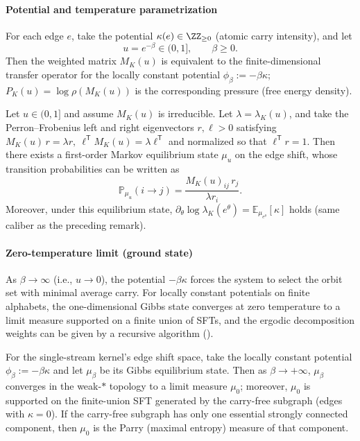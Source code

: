 \paragraph{Potential and temperature parametrization}
For each edge $e$, take the potential $\kappa(e)\in\ZZ_{\ge 0}$ (atomic carry intensity), and let
\[
u=e^{-\beta}\in(0,1],\qquad \beta\ge 0.
\]
Then the weighted matrix $M_K(u)$ is equivalent to the finite-dimensional transfer operator for the locally constant potential $\phi_\beta:=-\beta\kappa$; $P_K(u)=\log\rho(M_K(u))$ is the corresponding pressure (free energy density).

\begin{proposition}\label{prop:kernel-equilibrium-pf}
Let $u\in(0,1]$ and assume $M_K(u)$ is irreducible. Let $\lambda=\lambda_K(u)$, and take the Perron--Frobenius left and right eigenvectors $r,\ell>0$ satisfying
\(
M_K(u)\,r=\lambda r,\ \ell^{\mathsf T}M_K(u)=\lambda \ell^{\mathsf T}
\)
and normalized so that $\ell^{\mathsf T}r=1$. Then there exists a first-order Markov equilibrium state $\mu_u$ on the edge shift, whose transition probabilities can be written as
\[
\mathbb{P}_{\mu_u}(i\to j)=\frac{M_K(u)_{ij}\,r_j}{\lambda r_i}.
\]
Moreover, under this equilibrium state,
\(
\partial_\theta \log\lambda_K(e^\theta)=\mathbb{E}_{\mu_{e^\theta}}[\kappa]
\)
holds (same caliber as the preceding remark).
\end{proposition}

\paragraph{Zero-temperature limit (ground state)}
As $\beta\to\infty$ (i.e., $u\to 0$), the potential $-\beta\kappa$ forces the system to select the orbit set with minimal average carry. For locally constant potentials on finite alphabets, the one-dimensional Gibbs state converges at zero temperature to a limit measure supported on a finite union of SFTs, and the ergodic decomposition weights can be given by a recursive algorithm (\cite{ChazottesGambaudoUgalde2011ZeroTempLocConst}).

\begin{theorem}\label{thm:kernel-zero-temp}
For the single-stream kernel's edge shift space, take the locally constant potential $\phi_\beta:=-\beta\kappa$ and let $\mu_\beta$ be its Gibbs equilibrium state. Then as $\beta\to+\infty$, $\mu_\beta$ converges in the weak-$\ast$ topology to a limit measure $\mu_0$; moreover, $\mu_0$ is supported on the finite-union SFT generated by the carry-free subgraph (edges with $\kappa=0$). If the carry-free subgraph has only one essential strongly connected component, then $\mu_0$ is the Parry (maximal entropy) measure of that component.
\end{theorem}

